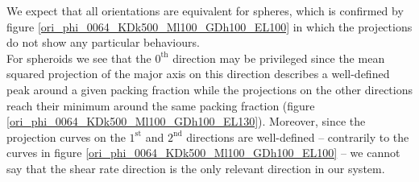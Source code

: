 \documentclass[class=report, float=false, crop=false]{standalone}
\begin{document}
We expect that all orientations are equivalent for spheres, which is confirmed by figure \ref{ori_phi_0064_KDk500_Ml100_GDh100_EL100} in which the projections do not show any particular behaviours.\\

For spheroids we see that the $0^{\text{th}}$ direction may be privileged since the mean squared projection of the major axis on this direction describes a well-defined peak around a given packing fraction while the projections on the other directions reach their minimum around the same packing fraction (figure \ref{ori_phi_0064_KDk500_Ml100_GDh100_EL130}). Moreover, since the projection curves on the $1^{\text{st}}$ and $2^{\text{nd}}$ directions are well-defined -- contrarily to the curves in figure \ref{ori_phi_0064_KDk500_Ml100_GDh100_EL100} -- we cannot say that the shear rate direction is the only relevant direction in our system.

\end{document}
